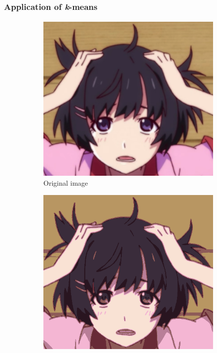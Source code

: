 \documentclass{beamer}                             %
\begin{document}
\begin{frame}
\frametitle{Application of \textit{k}-means}
\framesubtitle{}
\begin{figure}[h!]
    \centering
    \begin{subfigure}[h]{0.3 \textwidth}
      \includegraphics[scale=0.17]{hanekawa.png}
      \caption{Original image}
    \end{subfigure}
    \hfill
    \begin{subfigure}[h]{0.3 \textwidth}
      \includegraphics[scale=0.17]{hanekawa8.png}

\end{subfigure}
\end{figure}
\end{frame}
\end{document}

